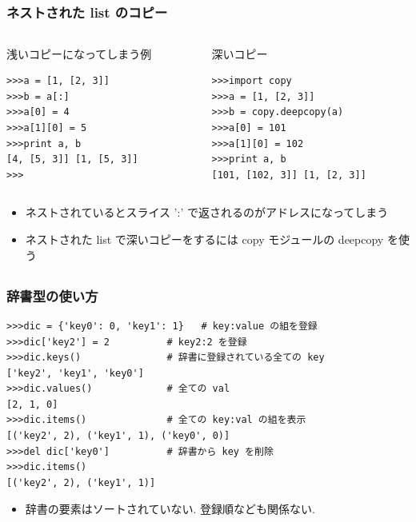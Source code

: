 \subsection*{\redm\whitem\greenb}
\begin{frame}[t,fragile]
\frametitle{ネストされた list のコピー}
\begin{columns}
\begin{column}{6cm}
浅いコピーになってしまう例
\begin{lstlisting}
>>>a = [1, [2, 3]]
>>>b = a[:]
>>>a[0] = 4
>>>a[1][0] = 5
>>>print a, b
[4, [5, 3]] [1, [5, 3]]
>>>
\end{lstlisting}
\end{column}

\begin{column}{6cm}
深いコピー
\begin{lstlisting}
>>>import copy
>>>a = [1, [2, 3]]
>>>b = copy.deepcopy(a)
>>>a[0] = 101
>>>a[1][0] = 102
>>>print a, b
[101, [102, 3]] [1, [2, 3]]
\end{lstlisting}
\end{column}
\end{columns}

\begin{itemize}
\item ネストされているとスライス ':' で返されるのがアドレスになってしまう
\item ネストされた list で深いコピーをするには copy モジュールの deepcopy を使う
\end{itemize}
\end{frame}

\subsection*{\redm\whiteb\greenb}
\begin{frame}[t,fragile]
\frametitle{辞書型の使い方}
\begin{lstlisting}
>>>dic = {'key0': 0, 'key1': 1}   # key:value の組を登録
>>>dic['key2'] = 2          # key2:2 を登録
>>>dic.keys()               # 辞書に登録されている全ての key
['key2', 'key1', 'key0']
>>>dic.values()             # 全ての val
[2, 1, 0]
>>>dic.items()              # 全ての key:val の組を表示
[('key2', 2), ('key1', 1), ('key0', 0)]  
>>>del dic['key0']          # 辞書から key を削除
>>>dic.items()
[('key2', 2), ('key1', 1)]
\end{lstlisting}

\begin{itemize}
\item 辞書の要素はソートされていない. 登録順なども関係ない. 
\end{itemize}
\end{frame}

